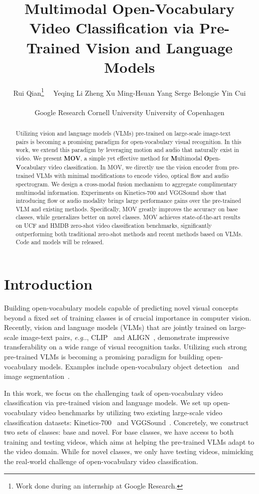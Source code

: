 \documentclass{article}
\title{Multimodal Open-Vocabulary Video Classification via Pre-Trained Vision and Language Models}
\author{
Rui Qian\thanks{Work done during an internship at Google Research.}~~\quad 
Yeqing Li\quad
Zheng Xu\quad 
Ming-Hsuan Yang\quad 
Serge Belongie\quad 
Yin Cui\\
\\
Google Research \qquad Cornell University \qquad University of Copenhagen
}
\makeatletter
\DeclareRobustCommand\onedot{\futurelet\@let@token\@onedot}
\def\@onedot{\ifx\@let@token.\else.\null\fi\xspace}
\def\eg{\emph{e.g}\onedot} \def\Eg{\emph{E.g}\onedot}
\makeatother
\begin{document}
\maketitle

\begin{abstract}
Utilizing vision and language models (VLMs) pre-trained on large-scale image-text pairs is becoming a promising paradigm for open-vocabulary visual recognition.
In this work, we extend this paradigm by leveraging motion and audio that naturally exist in video.
We present \textbf{MOV}, a simple yet effective method for \textbf{M}ultimodal \textbf{O}pen-\textbf{V}ocabulary video classification. 
In MOV, we directly use the vision encoder from pre-trained VLMs with minimal modifications to encode video, optical flow and audio spectrogram.
We design a cross-modal fusion mechanism to aggregate complimentary multimodal information.
Experiments on Kinetics-700 and VGGSound show that introducing flow or audio modality brings large performance gains over the pre-trained VLM and existing methods.
Specifically, MOV greatly improves the accuracy on base classes, while generalizes better on novel classes.
MOV achieves state-of-the-art results on UCF and HMDB zero-shot video classification benchmarks, significantly outperforming both traditional zero-shot methods and recent methods based on VLMs.
Code and models will be released.
\end{abstract}


\section{Introduction}
\label{sec:intro}

Building open-vocabulary models capable of predicting novel visual concepts beyond a fixed set of training classes is of crucial importance in computer vision.
Recently, vision and language models (VLMs) that are jointly trained on large-scale image-text pairs, \eg, CLIP~\cite{radford2021learning} and ALIGN~\cite{jia2021scaling}, demonstrate impressive transferability on a wide range of visual recognition tasks.
Utilizing such strong pre-trained VLMs is becoming a promising paradigm for building open-vocabulary models.
Examples include open-vocabulary object detection~\cite{gu2021open} and image segmentation~\cite{ghiasi2021open, li2022language}.

In this work, we focus on the challenging task of open-vocabulary video classification via pre-trained vision and language models. We set up open-vocabulary video benchmarks by utilizing two existing large-scale video classification datasets: Kinetics-700~\cite{carreira2019short} and VGGSound~\cite{chen2020vggsound}. 
Concretely, we construct two sets of classes: base and novel. For base classes, we have access to both training and testing videos, which aims at helping the pre-trained VLMs adapt to the video domain. While for novel classes, we only have testing videos, mimicking the real-world challenge of open-vocabulary video classification. 
\end{document}
